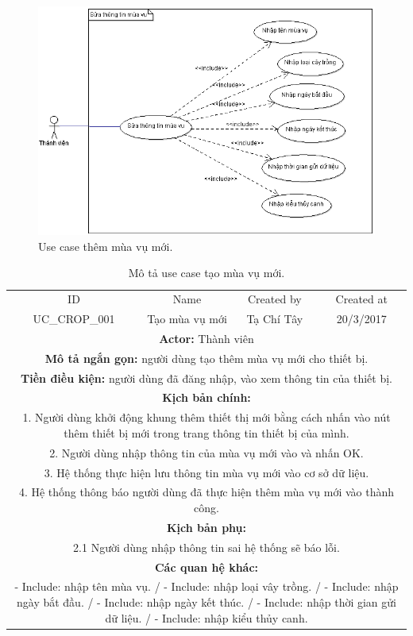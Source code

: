 \documentclass[a4paper,12pt,oneside]{article}
\begin{document}
\begin{figure}[H]
	\centering
	\includegraphics[scale=.7]{hinh/sttmv.png}
	\caption{Use case thêm mùa vụ mới.}
\end{figure}

\begin{table}[!htp]
\centering
\begin{tabularx}{\linewidth}{ |c||c|c|c| }
\hline
ID & Name & Created by & Created at\\
UC\_CROP\_001 & Tạo mùa vụ mới & Tạ Chí Tây & 20/3/2017\\
\hline
\multicolumn{4}{|X|}{\textbf{Actor:} Thành viên }\\
\hline
\multicolumn{4}{|X|}{\textbf{Mô tả ngắn gọn:} người dùng tạo thêm mùa vụ mới cho thiết bị. }\\
\hline
\multicolumn{4}{|X|}{\textbf{Tiền điều kiện:} người dùng đã đăng nhập, vào xem thông tin của thiết bị.}\\
\hline
\multicolumn{4}{|X|}{\textbf{Kịch bản chính:}}\\
\multicolumn{4}{|X|}{1. Người dùng khởi động khung thêm thiết thị mới bằng cách nhấn vào nút thêm thiết bị mới trong trang thông tin thiết bị của mình.}\\
\multicolumn{4}{|X|}{
2.	Người dùng nhập thông tin của mùa vụ mới vào và nhấn OK.}\\
\multicolumn{4}{|X|}{
3.	Hệ thống thực hiện lưu thông tin mùa vụ mới vào cơ sở dữ liệu.}\\
\multicolumn{4}{|X|}{
4. Hệ thống thông báo người dùng đã thực hiện thêm mùa vụ mới vào thành công.}\\
\hline
\multicolumn{4}{|X|}{\textbf{Kịch bản phụ:}}\\
\multicolumn{4}{|X|}{
2.1    Người dùng nhập thông tin sai hệ thống sẽ báo lỗi.}\\
\hline
\multicolumn{4}{|X|}{\textbf{Các quan hệ khác:}}\\
\multicolumn{4}{|X|}{- Include: nhập tên mùa vụ. / - Include: nhập loại vây trồng. / - Include: nhập ngày bắt đầu. / - Include: nhập ngày kết thúc. / - Include: nhập thời gian gửi dữ liệu. / - Include: nhập kiểu thủy canh.}\\
\hline

\end{tabularx}
\caption{Mô tả use case tạo mùa vụ mới.}
\end{table}
\end{document}
